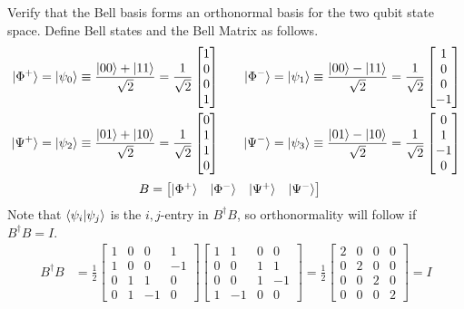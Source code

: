  Verify that the Bell basis forms an orthonormal basis for the two qubit state space.
Define Bell states and the Bell Matrix as follows.
\begin{align*}
    \ket{\Phi^+}=\ket{\psi_0} \equiv \frac{\ket{00} + \ket{11}}{\sqrt{2}} = \frac{1}{\sqrt{2}} \begin{bmatrix}
    1 \\
    0 \\
    0 \\
    1
    \end{bmatrix} &~~~& 
    \ket{\Phi^-}=\ket{\psi_1} \equiv \frac{\ket{00} - \ket{11}}{\sqrt{2}} = \frac{1}{\sqrt{2}} \begin{bmatrix}
    1 \\
    0 \\
    0 \\
    -1
    \end{bmatrix} \\
    \ket{\Psi^+}=\ket{\psi_2} \equiv \frac{\ket{01} + \ket{10}}{\sqrt{2}} = \frac{1}{\sqrt{2}} \begin{bmatrix}
    0 \\
    1 \\
    1 \\
    0
    \end{bmatrix} &~~~& 
    \ket{\Psi^-}=\ket{\psi_3} \equiv \frac{\ket{01} - \ket{10}}{\sqrt{2}} = \frac{1}{\sqrt{2}} \begin{bmatrix}
    0 \\
    1 \\
    -1 \\
    0
    \end{bmatrix}
    \end{align*}
    \begin{align*}
    B = \begin{bmatrix}\ket{\Phi^+} & \ket{\Phi^-} &  \ket{\Psi^+} &  \ket{\Psi^-}\end{bmatrix} &&
\end{align*}
Note that $\braket{\psi_i|\psi_j}$ is the $i,j$-entry in $B^\dagger B$, so orthonormality will follow if $B^\dagger B = I$.
\begin{align*}
 B^\dagger B &= \frac{1}{2}\begin{bmatrix}1 & 0 & 0 & 1 \\ 1 & 0 & 0& -1 \\ 0 & 1 & 1 & 0 \\ 0 & 1 & -1 & 0\end{bmatrix}\begin{bmatrix} 1 & 1 & 0 & 0 \\ 0 & 0 & 1 & 1 \\ 0 & 0 & 1 & -1 \\ 1 & -1 & 0 & 0\end{bmatrix} = \frac{1}{2}\begin{bmatrix}2 & 0 & 0 & 0\\ 0 & 2 & 0 & 0 \\ 0 & 0 & 2 & 0 \\ 0 & 0 & 0 &2\end{bmatrix} = I
 \end{align*}
